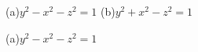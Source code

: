 {\begin{minipage}[m]{\linewidth}
\centering
{}

(a)\quad $y^2-x^2-z^2=1$ \qquad\qquad (b)\quad $y^2+x^2-z^2=1$
\end{minipage}
}
{(a)\quad $y^2-x^2-z^2=1$
}
